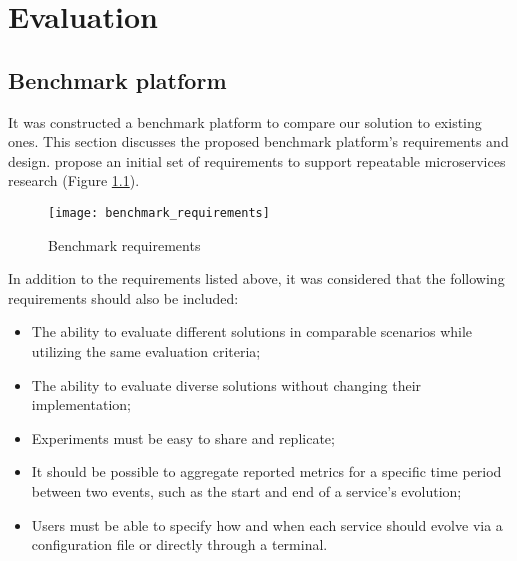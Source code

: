 
%

\chapter{Evaluation}
\label{cha:evaluation}

\section{Benchmark platform} %
\label{sec:benchmark_platform}

It was constructed a benchmark platform to compare our solution to existing ones.
This section discusses the proposed benchmark platform's requirements and design.
\citeauthor{microservices2017benchmark} \cite{microservices2017benchmark} propose an initial set of requirements
to support repeatable microservices research (Figure \ref{fig:benchmark}).

\begin{figure}[htbp]
    \centering
    \centerline{\texttt{[image: benchmark\_requirements]}}
    \caption{Benchmark requirements \cite{microservices2017benchmark}}
    \label{fig:benchmark}
\end{figure}

In addition to the requirements listed above, it was considered that the following requirements should also be included:
\begin{itemize}
    \setlength\itemsep{0em}
    \item The ability to evaluate different solutions in comparable scenarios while utilizing the same evaluation criteria;
    \item The ability to evaluate diverse solutions without changing their implementation;
    \item Experiments must be easy to share and replicate;
    \item It should be possible to aggregate reported metrics for a specific time period between two events, such as the start and end of a service's evolution;
    \item Users must be able to specify how and when each service should evolve via a configuration file or directly through a terminal.
\end{itemize}

